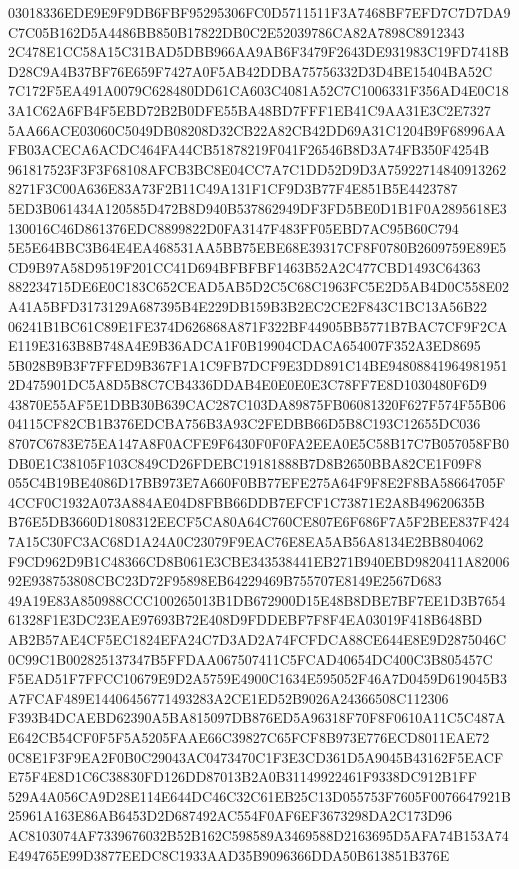 \documentclass[UTF8,fontset=fandol,zihao=-4,a4paper]{ctexart}
\begin{document}
{{03018336EDE9E9F9DB6FBF95295306FC0D5711511F3A7468BF7EFD7C7D7DA9C7C05B162D5A4486BB850B17822DB0C2E52039786CA82A7898C8912343
2C478E1CC58A15C31BAD5DBB966AA9AB6F3479F2643DE931983C19FD7418BD28C9A4B37BF76E659F7427A0F5AB42DDBA75756332D3D4BE15404BA52C
7C172F5EA491A0079C628480DD61CA603C4081A52C7C1006331F356AD4E0C183A1C62A6FB4F5EBD72B2B0DFE55BA48BD7FFF1EB41C9AA31E3C2E7327
5AA66ACE03060C5049DB08208D32CB22A82CB42DD69A31C1204B9F68996AAFB03ACECA6ACDC464FA44CB51878219F041F26546B8D3A74FB350F4254B
961817523F3F3F68108AFCB3BC8E04CC7A7C1DD52D9D3A759227148409132628271F3C00A636E83A73F2B11C49A131F1CF9D3B77F4E851B5E4423787
5ED3B061434A120585D472B8D940B537862949DF3FD5BE0D1B1F0A2895618E3130016C46D861376EDC8899822D0FA3147F483FF05EBD7AC95B60C794
5E5E64BBC3B64E4EA468531AA5BB75EBE68E39317CF8F0780B2609759E89E5CD9B97A58D9519F201CC41D694BFBFBF1463B52A2C477CBD1493C64363
882234715DE6E0C183C652CEAD5AB5D2C5C68C1963FC5E2D5AB4D0C558E02A41A5BFD3173129A687395B4E229DB159B3B2EC2CE2F843C1BC13A56B22
06241B1BC61C89E1FE374D626868A871F322BF44905BB5771B7BAC7CF9F2CAE119E3163B8B748A4E9B36ADCA1F0B19904CDACA654007F352A3ED8695
5B028B9B3F7FFED9B367F1A1C9FB7DCF9E3DD891C14BE948088419649819512D475901DC5A8D5B8C7CB4336DDAB4E0E0E0E3C78FF7E8D1030480F6D9
43870E55AF5E1DBB30B639CAC287C103DA89875FB06081320F627F574F55B0604115CF82CB1B376EDCBA756B3A93C2FEDBB66D5B8C193C12655DC036
8707C6783E75EA147A8F0ACFE9F6430F0F0FA2EEA0E5C58B17C7B057058FB0DB0E1C38105F103C849CD26FDEBC19181888B7D8B2650BBA82CE1F09F8
055C4B19BE4086D17BB973E7A660F0BB77EFE275A64F9F8E2F8BA58664705F4CCF0C1932A073A884AE04D8FBB66DDB7EFCF1C73871E2A8B49620635B
B76E5DB3660D1808312EECF5CA80A64C760CE807E6F686F7A5F2BEE837F4247A15C30FC3AC68D1A24A0C23079F9EAC76E8EA5AB56A8134E2BB804062
F9CD962D9B1C48366CD8B061E3CBE343538441EB271B940EBD9820411A8200692E938753808CBC23D72F95898EB64229469B755707E8149E2567D683
49A19E83A850988CCC100265013B1DB672900D15E48B8DBE7BF7EE1D3B765461328F1E3DC23EAE97693B72E408D9FDDEBF7F8F4EA03019F418B648BD
AB2B57AE4CF5EC1824EFA24C7D3AD2A74FCFDCA88CE644E8E9D2875046C0C99C1B002825137347B5FFDAA067507411C5FCAD40654DC400C3B805457C
F5EAD51F7FFCC10679E9D2A5759E4900C1634E595052F46A7D0459D619045B3A7FCAF489E14406456771493283A2CE1ED52B9026A24366508C112306
F393B4DCAEBD62390A5BA815097DB876ED5A96318F70F8F0610A11C5C487AE642CB54CF0F5F5A5205FAAE66C39827C65FCF8B973E776ECD8011EAE72
0C8E1F3F9EA2F0B0C29043AC0473470C1F3E3CD361D5A9045B43162F5EACFE75F4E8D1C6C38830FD126DD87013B2A0B31149922461F9338DC912B1FF
529A4A056CA9D28E114E644DC46C32C61EB25C13D055753F7605F0076647921B25961A163E86AB6453D2D687492AC554F0AF6EF3673298DA2C173D96
AC8103074AF7339676032B52B162C598589A3469588D2163695D5AFA74B153A74E494765E99D3877EEDC8C1933AAD35B9096366DDA50B613851B376E
}}
\end{document}
